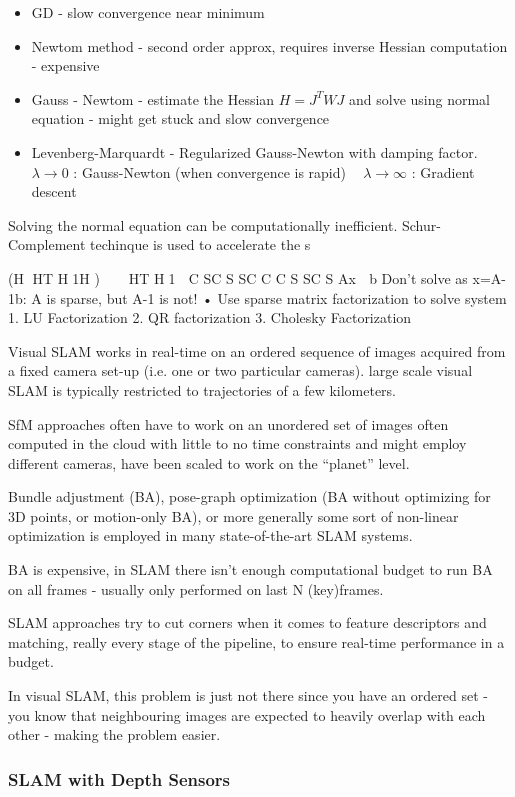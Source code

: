 \begin{itemize}
\item GD - slow convergence near minimum
\item Newtom method - second order approx, requires inverse Hessian computation - expensive
\item Gauss - Newtom - estimate the Hessian $H = J^TWJ$ and solve using normal equation - might get stuck and slow convergence 
\item Levenberg-Marquardt - Regularized Gauss-Newton with damping factor. 
􏰍 􏰎$ \lambda \to 0$ : Gauss-Newton (when convergence is rapid)
􏰍 􏰎$ \lambda \to \infty$ : Gradient descent
\end{itemize}

Solving the normal equation can be computationally inefficient. Schur-Complement techinque is used to accelerate the s

(H 􏰃HT H􏰃1H )􏰌 􏰆􏰐 􏰃􏰐HT H􏰃1 􏰑 C SC S SC C C S SC S
Ax 􏰆 b Don’t solve as x=A-1b: A is sparse, but A-1 is not!
• Use sparse matrix factorization to solve system
1. LU Factorization
2. QR factorization
3. Cholesky Factorization

Visual SLAM works in real-time on an ordered sequence of images acquired from a fixed camera set-up (i.e. one or two particular cameras). 
large scale visual SLAM is typically restricted to trajectories of a few kilometers.

SfM approaches often have to work on an unordered set of images often computed in the cloud with little to no time constraints and might employ different cameras, have been scaled to work on the “planet” level. 

Bundle adjustment (BA), pose-graph optimization (BA without optimizing for 3D points, or motion-only BA), or more generally some sort of non-linear optimization is employed in many state-of-the-art SLAM systems. 

BA is expensive, in SLAM there isn't enough computational budget to run BA on all frames - usually only performed on last N (key)frames. 

SLAM approaches try to cut corners when it comes to feature descriptors and matching, really every stage of the pipeline, to ensure real-time performance in a budget.

In visual SLAM, this problem is just not there since you have an ordered set - you know that neighbouring images are expected to heavily overlap with each other - making the problem easier.

\subsubsection{SLAM with Depth Sensors}

